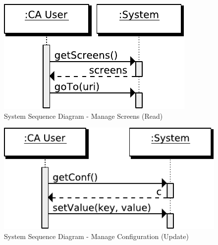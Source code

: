 \begin{figure}[htb]
    \centering
    \includegraphics{figures/spec-seq-manage-screens-read.pdf}
    \caption{System Sequence Diagram - Manage Screens (Read)}
    \label{fig:spec-manage-screens-read}
\end{figure}

\begin{figure}[htb]
    \centering
    \includegraphics{figures/spec-seq-manage-conf-update.pdf}
    \caption{System Sequence Diagram - Manage Configuration (Update)}
    \label{fig:spec-manage-conf-create}
\end{figure}

